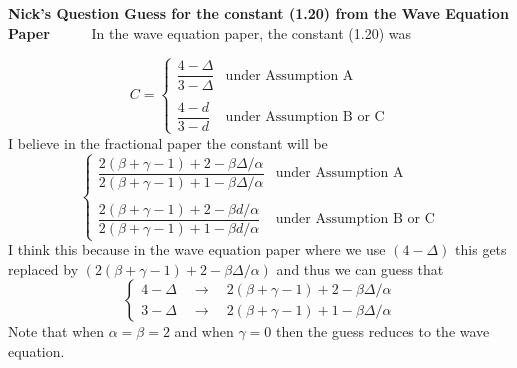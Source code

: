 \documentclass[a4paper,11pt]{article}
\numberwithin{equation}{section}
\theoremstyle{plain}
\theoremstyle{definition}
\newcounter{NQ}
\newenvironment{NickQuestion}[1][] %
{\refstepcounter{NQ}
	\begin{mdframed}[backgroundcolor=lightgray]\textbf{Nick's Question \theNQ \: #1~~}~~~\noindent}%
	{\end{mdframed}}
\numberwithin{NQ}{section}
\numberwithin{LQ}{section}
\numberwithin{ZQ}{section}
\begin{document}
	\begin{NickQuestion}[Guess for the constant (1.20) from the Wave Equation Paper]
		In the wave equation paper, the constant (1.20) was

		\begin{equation} \label{const}
		C =	\begin{cases}
		\dfrac{4-\Delta}{3-\Delta} & \text{under Assumption A}
		\\ \\ \dfrac{4-d}{3-d} & \text{under Assumption B or C}
		\end{cases}
		\end{equation}
		I believe in the fractional paper the constant will be
		\[
		\begin{cases}
		\dfrac{2(\beta+\gamma-1)+2 - \beta \Delta / \alpha}{2(\beta+\gamma-1)+1 - \beta \Delta / \alpha} & \text{under Assumption A}
		\\ \\ \dfrac{2(\beta+\gamma-1)+2 - \beta d/ \alpha}{2(\beta+\gamma-1)+1 - \beta d/ \alpha} & \text{under Assumption B or C}
		\end{cases}
		\]
		I think this because in the wave equation paper where we use $(4-\Delta)$ this gets replaced by $(2(\beta+\gamma-1)+2 - \beta \Delta / \alpha)$ and thus we can guess that
		\[
		\begin{cases}
		4- \Delta \quad  \to \quad  2(\beta+\gamma-1)+2 - \beta \Delta / \alpha
		\\ 3 - \Delta \quad  \to \quad 2(\beta+\gamma-1)+1 - \beta \Delta / \alpha
		\end{cases}
		\]
		Note that when $\alpha = \beta =2 $ and when $\gamma = 0$ then the guess reduces to the wave equation.
	\end{NickQuestion}
\end{document}

